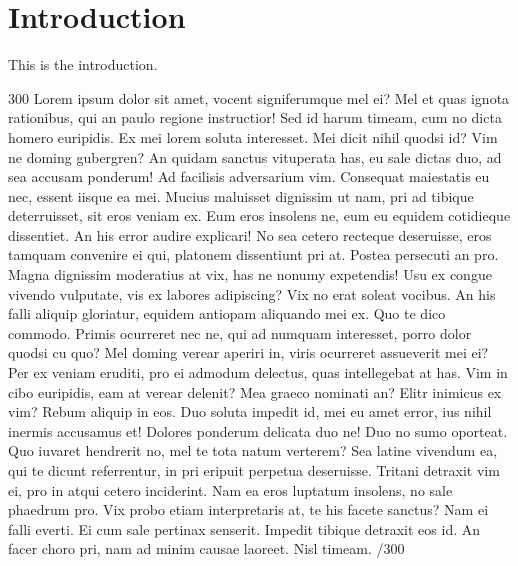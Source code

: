 \documentclass{sigchi}
\begin{document}




\section{Introduction}
This is the introduction.

300 Lorem ipsum dolor sit amet, vocent signiferumque mel ei? Mel et quas ignota rationibus, qui an paulo regione instructior! Sed id harum timeam, cum no dicta homero euripidis. Ex mei lorem soluta interesset. Mei dicit nihil quodsi id? Vim ne doming gubergren? An quidam sanctus vituperata has, eu sale dictas duo, ad sea accusam ponderum! Ad facilisis adversarium vim. Consequat maiestatis eu nec, essent iisque ea mei. Mucius maluisset dignissim ut nam, pri ad tibique deterruisset, sit eros veniam ex. Eum eros insolens ne, eum eu equidem cotidieque dissentiet. An his error audire explicari! No sea cetero recteque deseruisse, eros tamquam convenire ei qui, platonem dissentiunt pri at. Postea persecuti an pro. Magna dignissim moderatius at vix, has ne nonumy expetendis! Usu ex congue vivendo vulputate, vis ex labores adipiscing? Vix no erat soleat vocibus. An his falli aliquip gloriatur, equidem antiopam aliquando mei ex. Quo te dico commodo. Primis ocurreret nec ne, qui ad numquam interesset, porro dolor quodsi cu quo? Mel doming verear aperiri in, viris ocurreret assueverit mei ei? Per ex veniam eruditi, pro ei admodum delectus, quas intellegebat at has. Vim in cibo euripidis, eam at verear delenit? Mea graeco nominati an? Elitr inimicus ex vim? Rebum aliquip in eos. Duo soluta impedit id, mei eu amet error, ius nihil inermis accusamus et! Dolores ponderum delicata duo ne! Duo no sumo oporteat. Quo iuvaret hendrerit no, mel te tota natum verterem? Sea latine vivendum ea, qui te dicunt referrentur, in pri eripuit perpetua deseruisse. Tritani detraxit vim ei, pro in atqui cetero inciderint. Nam ea eros luptatum insolens, no sale phaedrum pro. Vix probo etiam interpretaris at, te his facete sanctus? Nam ei falli everti. Ei cum sale pertinax senserit. Impedit tibique detraxit eos id. An facer choro pri, nam ad minim causae laoreet. Nisl timeam. /300
\end{document}
